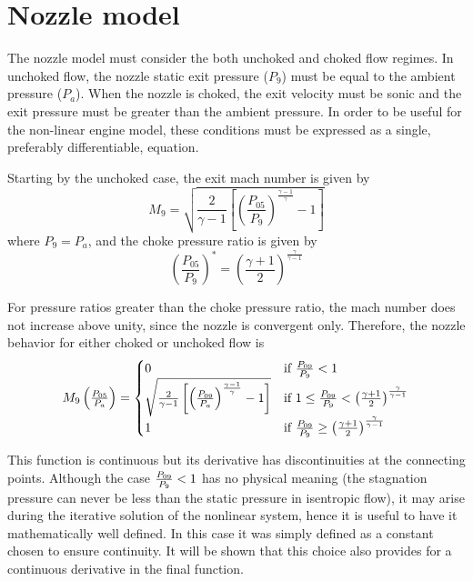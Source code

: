 \documentclass[tcc]{subfiles}
\begin{document}
\section{Nozzle model}
The nozzle model must consider the both unchoked and choked flow regimes. 
In unchoked flow, the nozzle static exit pressure ($P_9$) must be equal to the ambient pressure ($P_a$). 
When the nozzle is choked, the exit velocity must be sonic 
and the exit pressure must be greater than the ambient pressure.
In order to be useful for the non-linear engine model, these conditions must be expressed as a single, preferably differentiable, equation. 

Starting by the unchoked case, the exit mach number is given by
\begin{equation}
    M_9 = \sqrt{\frac{2}{\gamma-1}\left[\left(\frac{P_{05}}{P_9}\right)^{\frac{\gamma-1}{\gamma}}-1\right]}
\end{equation}
where $P_9=P_a$, and the choke pressure ratio is given by
\begin{equation}
    \left(\frac{P_{05}}{P_9}\right)^* = \left(\frac{\gamma+1}{2}\right)^\frac{\gamma}{\gamma-1}
\end{equation}

For pressure ratios greater than the choke pressure ratio, the mach number does not increase above unity, 
since the nozzle is convergent only. Therefore, the nozzle behavior for either choked or unchoked flow is
\begin{equation}
    \label{eqn:M9}
    M_9\left(\tfrac{P_{05}}{P_a}\right) = \begin{cases}
        0 &\text{if $\frac{P_{09}}{P_{9}} < 1$} \\
        \sqrt{\frac{2}{\gamma-1}\left[\left(\frac{P_{09}}{P_a}\right)^{\frac{\gamma-1}{\gamma}}-1\right]} 
        &\text{if $1 \leq \frac{P_{09}}{P_{9}} <\left(\frac{\gamma+1}{2}\right)^\frac{\gamma}{\gamma-1}$} \\
        1 & \text{if $\frac{P_{09}}{P_{9}} \geq \left(\frac{\gamma+1}{2}\right)^\frac{\gamma}{\gamma-1}$ }
    \end{cases}
\end{equation}


This function is continuous but its derivative has discontinuities at the connecting points. 
Although the case $\frac{P_{09}}{P_{9}}<1$ has no physical meaning 
(the stagnation pressure can never be less than the static pressure in isentropic flow), 
it may arise during the iterative solution of the nonlinear system, 
hence it is useful to have it mathematically well defined. 
In this case it was simply defined as a constant chosen to ensure continuity. It will be shown that this choice also provides for a continuous derivative in the final function.
\end{document}
